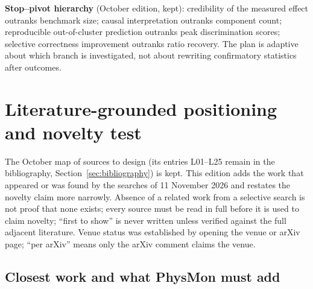 \documentclass[10pt,a4paper]{article}
\begin{document}
\textbf{Stop--pivot hierarchy} (October edition, kept): credibility of the measured effect outranks benchmark
size; causal interpretation outranks component count; reproducible out-of-cluster prediction outranks peak
discrimination scores; selective correctness improvement outranks ratio recovery. The plan is adaptive about which
branch is investigated, not about rewriting confirmatory statistics after outcomes.

\section{Literature-grounded positioning and novelty test}
\label{sec:literature}

The October map of sources to design (its entries L01--L25 remain in the bibliography,
Section~\ref{sec:bibliography}) is kept. This edition adds the work that appeared or was found by the searches of
11 November 2026 and restates the novelty claim more narrowly. Absence of a related work from a selective search
is not proof that none exists; every source must be read in full before it is used to claim novelty; ``first to
show'' is never written unless verified against the full adjacent literature. Venue status was established by
opening the venue or arXiv page; ``per arXiv'' means only the arXiv comment claims the venue.

\subsection{Closest work and what PhysMon must add}
\end{document}
